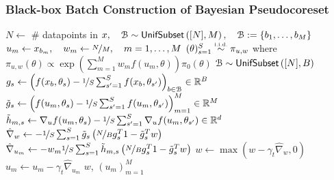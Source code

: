 \documentclass[hyperref={colorlinks = true},unknownkeysallowed]{beamer}
\begin{document}
\begin{frame}
	\frametitle{Black-box Batch Construction of Bayesian Pseudocoreset}
	\vspace{-0.7cm}
  \scriptsize 
	\begin{algorithmic}[1]
		\State $N \gets $ \# datapoints in $x, \quad \mathcal{B}\sim{\sf{UnifSubset}}\left([N], M\right), \quad \mathcal{B} := \left\{b_1, \dots, b_M\right\}$ 
		\State $u_m \gets x_{b_m}, \quad w_m \gets \nicefrac{N}{M}, \quad m=1, \dots, M$
		\State $(\theta)_{s=1}^{S}  \distiid \pi_{u,w}$ where $\pi_{u,w}(\theta) \propto \exp\left(\sum_{m=1}^Mw_m f(u_m, \theta)\right)\pi_0(\theta)$
		\State $\mathcal{B}\sim{\sf{UnifSubset}}\left([N], B\right)$
		 	
		\State $g_{s} \gets \left( f(x_b, \theta_s ) - \nicefrac{1}{S}\sum_{s'=1}^S f(x_b, \theta_{s'}) \right)_{b\in\mathcal{B}} \in \mathbb{R}^B$ 
		\State $\tilde{g}_s\gets \left(f(u_m, \theta_s) - \nicefrac{1}{S}\sum_{s'=1}^S f(u_m, \theta_{s'})\right)_{m=1}^M\in\mathbb{R}^M$
		\State $\tilde{h}_{m,s} \gets \nabla_u f(u_m, \theta_s) - \nicefrac{1}{S}\sum_{s'=1}^S \nabla_u f(u_m, \theta_{s'})\in\mathbb{R}^d$
		\EndFor
		\EndFor
		\State $\hat\nabla_w \gets -\nicefrac{1}{S}\sum_{s=1}^S \tilde{g}_s\left(\nicefrac{N}{B} g_s^T1 - \tilde{g}_s^Tw\right)$
		\State $\hat\nabla_{u_m} \gets -w_m\nicefrac{1}{S}\sum_{s=1}^S \tilde{h}_{m,s}\left(\nicefrac{N}{B} g_s^T1 - \tilde{g}_s^Tw\right)$
		\EndFor
		\State $w \gets \max(w - \gamma_t\hat\nabla_w, 0)$ 
		\State $u_m \gets u_m - \gamma_t\hat\nabla_{u_m}$
		\EndFor
		\EndFor
		\State\Return $w$, $(u_m)_{m=1}^M$
		\EndProcedure		 
	\end{algorithmic}
\normalsize
	\end{frame}
\end{document}
